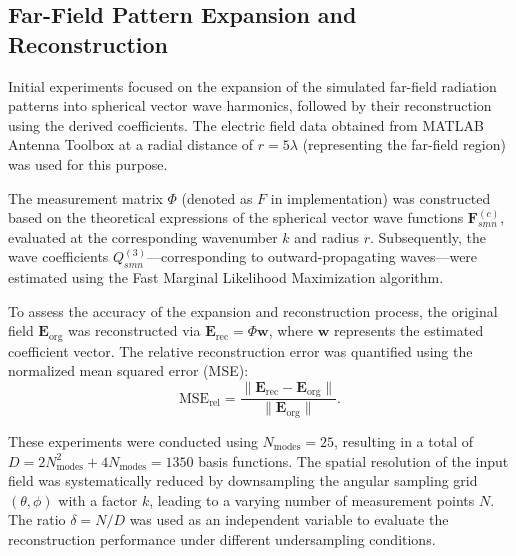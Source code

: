 \documentclass{article}
\begin{document}
\subsection{Far-Field Pattern Expansion and Reconstruction}

Initial experiments focused on the expansion of the simulated far-field radiation patterns into spherical vector wave harmonics, followed by their reconstruction using the derived coefficients. The electric field data obtained from MATLAB Antenna Toolbox at a radial distance of $r = 5\lambda$ (representing the far-field region) was used for this purpose.

The measurement matrix $\Phi$ (denoted as $F$ in implementation) was constructed based on the theoretical expressions of the spherical vector wave functions $\mathbf{F}_{smn}^{(c)}$, evaluated at the corresponding wavenumber $k$ and radius $r$. Subsequently, the wave coefficients $Q_{smn}^{(3)}$—corresponding to outward-propagating waves—were estimated using the Fast Marginal Likelihood Maximization algorithm.

To assess the accuracy of the expansion and reconstruction process, the original field $\mathbf{E}_{\text{org}}$ was reconstructed via $\mathbf{E}_{\text{rec}} = \Phi \mathbf{w}$, where $\mathbf{w}$ represents the estimated coefficient vector. The relative reconstruction error was quantified using the normalized mean squared error (MSE):
\[
\text{MSE}_{\text{rel}} = \frac{\|\mathbf{E}_{\text{rec}} - \mathbf{E}_{\text{org}}\|}{\|\mathbf{E}_{\text{org}}\|}.
\]

These experiments were conducted using $N_{\text{modes}} = 25$, resulting in a total of $D = 2N_{\text{modes}}^2 + 4N_{\text{modes}} = 1350$ basis functions. The spatial resolution of the input field was systematically reduced by downsampling the angular sampling grid $(\theta, \phi)$ with a factor $k$, leading to a varying number of measurement points $N$. The ratio $\delta = N/D$ was used as an independent variable to evaluate the reconstruction performance under different undersampling conditions.
\end{document}
